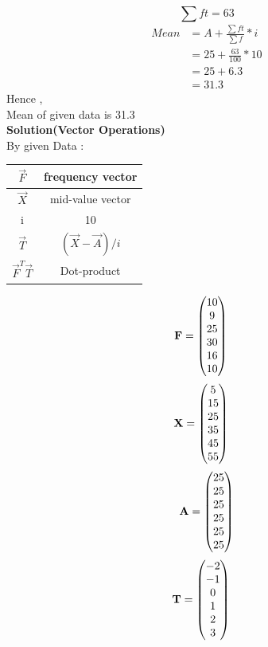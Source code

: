 \documentclass[journal,12pt,twocolumn]{IEEEtran}
\begin{document}
\begin{equation*}
\sum ft = 63
\end{equation*}
\begin{align*}
Mean & = A + \frac{ \sum ft }{\sum f} * i\\
     & = 25 + \frac{63}{100} * 10\\
     & = 25 + 6.3\\
     & = 31.3
\end{align*}
Hence ,\\ Mean of given data is 31.3\\
\textbf{Solution(Vector Operations)}\\
By given Data :\\
\begin{table}[h!]
\center
{
\begin{tabular}{|c|c|}
\hline
$\vec{F}$ & frequency vector\\
\hline
$\vec{X}$ & mid-value vector\\
\hline
i &  10\\
\hline
$\vec{T}$ &  $(\vec{X}-\vec{A})/i$\\
\hline
$\vec{F}^{T}\vec{T}$ &  Dot-product\\
\hline
\end{tabular}
}
\end{table}
\begin{align}
\mathbf{F} & = 
\begin{pmatrix}10 \\ 9 \\ 25 \\ 30 \\ 16 \\ 10\end{pmatrix}
\end{align}
\begin{align}
\mathbf{X} & = 
\begin{pmatrix}5 \\ 15 \\ 25 \\ 35 \\ 45 \\ 55\end{pmatrix}
\end{align}
\begin{align}
\mathbf{A} = 
\begin{pmatrix}25\\25\\25\\25\\25\\25\end{pmatrix}
\end{align}
\begin{align}
\mathbf{T} & =
\begin{pmatrix}-2 \\ -1 \\ 0 \\ 1 \\ 2 \\ 3 \end{pmatrix}
\end{align}
\end{document}
